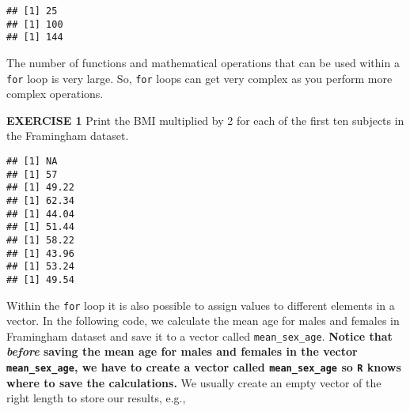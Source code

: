 \documentclass[
]{article}
\newenvironment{Shaded}{\begin{snugshade}}{\end{snugshade}}
\newcommand{\CommentTok}[1]{\textcolor[rgb]{0.56,0.35,0.01}{\textit{#1}}}
\newcommand{\ControlFlowTok}[1]{\textcolor[rgb]{0.13,0.29,0.53}{\textbf{#1}}}
\newcommand{\DecValTok}[1]{\textcolor[rgb]{0.00,0.00,0.81}{#1}}
\newcommand{\KeywordTok}[1]{\textcolor[rgb]{0.13,0.29,0.53}{\textbf{#1}}}
\newcommand{\NormalTok}[1]{#1}
\newcommand{\OperatorTok}[1]{\textcolor[rgb]{0.81,0.36,0.00}{\textbf{#1}}}
\newcommand{\StringTok}[1]{\textcolor[rgb]{0.31,0.60,0.02}{#1}}
\begin{document}
\begin{verbatim}
## [1] 25
## [1] 100
## [1] 144
\end{verbatim}

The number of functions and mathematical operations that can be used
within a \texttt{for} loop is very large. So, \texttt{for} loops can get
very complex as you perform more complex operations.

\textbf{EXERCISE 1} Print the BMI multiplied by 2 for each of the first
ten subjects in the Framingham dataset.

\begin{Shaded}
\end{Shaded}

\begin{verbatim}
## [1] NA
## [1] 57
## [1] 49.22
## [1] 62.34
## [1] 44.04
## [1] 51.44
## [1] 58.22
## [1] 43.96
## [1] 53.24
## [1] 49.54
\end{verbatim}

Within the \texttt{for} loop it is also possible to assign values to
different elements in a vector. In the following code, we calculate the
mean age for males and females in Framingham dataset and save it to a
vector called \texttt{mean\_sex\_age}. \textbf{Notice that \emph{before}
saving the mean age for males and females in the vector
\texttt{mean\_sex\_age}, we have to create a vector called
\texttt{mean\_sex\_age} so \texttt{R} knows where to save the
calculations.} We usually create an empty vector of the right length to
store our results, e.g.,
\end{document}
